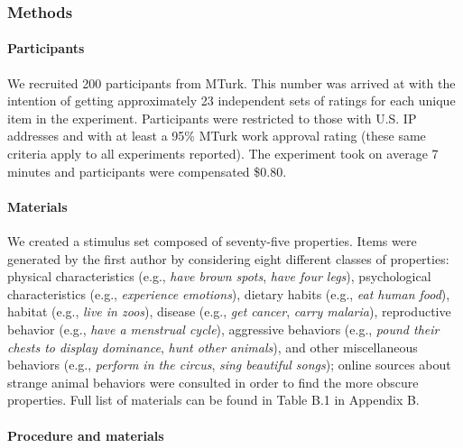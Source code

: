 \documentclass[floatsintext,doc]{apa6}
\let\oldparagraph\paragraph
\renewcommand{\paragraph}[1]{\oldparagraph{#1}\mbox{}}
\begin{document}
\hypertarget{methods}{%
\subsubsection{Methods}\label{methods}}

\hypertarget{participants-1}{%
\paragraph{Participants}\label{participants-1}}

We recruited 200 participants from MTurk.
This number was arrived at with the intention of getting approximately 23 independent sets of ratings for each unique item in the experiment.
Participants were restricted to those with U.S. IP addresses and with at least a 95\% MTurk work approval rating (these same criteria apply to all experiments reported).
The experiment took on average 7 minutes and participants were compensated \$0.80.

\hypertarget{materials}{%
\paragraph{Materials}\label{materials}}

We created a stimulus set composed of seventy-five properties.
Items were generated by the first author by considering eight different classes of properties: physical characteristics (e.g., \emph{have brown spots}, \emph{have four legs}), psychological characteristics (e.g., \emph{experience emotions}), dietary habits (e.g., \emph{eat human food}), habitat (e.g., \emph{live in zoos}), disease (e.g., \emph{get cancer}, \emph{carry malaria}), reproductive behavior (e.g., \emph{have a menstrual cycle}), aggressive behaviors (e.g., \emph{pound their chests to display dominance}, \emph{hunt other animals}), and other miscellaneous behaviors (e.g., \emph{perform in the circus}, \emph{sing beautiful songs}); online sources about strange animal behaviors were consulted in order to find the more obscure properties. Full list of materials can be found in Table B.1 in Appendix B.

\hypertarget{procedure-and-materials-1}{%
\paragraph{Procedure and materials}\label{procedure-and-materials-1}}
\end{document}
